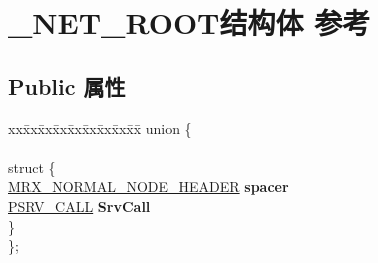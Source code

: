 \hypertarget{struct___n_e_t___r_o_o_t}{}\section{\+\_\+\+N\+E\+T\+\_\+\+R\+O\+O\+T结构体 参考}
\label{struct___n_e_t___r_o_o_t}
\subsection*{Public 属性}
\begin{DoxyCompactItemize}
\item 
\mbox{\label{struct___n_e_t___r_o_o_t_a1583a135f6ff179b05ed052cf0a3d09e}} 
\begin{tabbing}
xx\=xx\=xx\=xx\=xx\=xx\=xx\=xx\=xx\=\kill
union \{\\
\\
\mbox{\label{union___n_e_t___r_o_o_t_1_1_0D1572_a856d997032a5a15f138e6c004b29778e}} 
\>struct \{\\
\>\>\hyperlink{struct___m_r_x___n_o_r_m_a_l___n_o_d_e___h_e_a_d_e_r}{MRX\_NORMAL\_NODE\_HEADER} {\bfseries spacer}\\
\>\>\hyperlink{struct___s_r_v___c_a_l_l}{PSRV\_CALL} {\bfseries SrvCall}\\
\>\} \\
\}; \\


\end{tabbing}
\end{DoxyCompactItemize}

